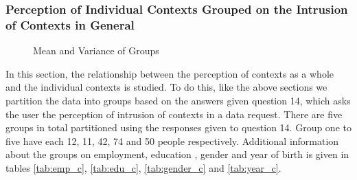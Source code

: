 \subsubsection{Perception of Individual Contexts Grouped on the Intrusion of Contexts in General}

\begin{figure}[htp]
\caption{Mean and Variance of Groups}
\label{fig:co3}
\end{figure}

In this section, the relationship between the perception of contexts as a whole and the individual contexts is studied. 
To do this, like the above sections we partition the data into groups based on the answers given question 14, which asks the user the perception of intrusion of contexts in a data request. There are five groups in total partitioned using the responses given to question 14. Group one to five have each 12, 11, 42, 74 and 50 people respectively. Additional
information about the groups on employment, education , gender and year of birth is given in tables \ref{tab:emp_c}, \ref{tab:edu_c}, \ref{tab:gender_c} and \ref{tab:year_c}. 

